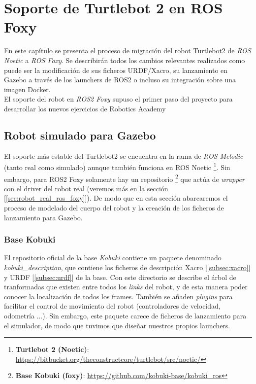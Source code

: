 \chapter{Soporte de Turtlebot 2 en ROS Foxy}
\label{cap:capitulo4}

En este capítulo se presenta el proceso de migración del robot Turtlebot2 de \textit{ROS Noetic} a \textit{ROS Foxy}. Se describirán todos los cambios relevantes realizados como puede ser la modificación de sus ficheros URDF/Xacro, su lanzamiento en Gazebo a través de los launchers de ROS2 o incluso su integración sobre una imagen Docker.\\

El soporte del robot en \textit{ROS2 Foxy} supuso el primer paso del proyecto para desarrollar los nuevos ejercicios de Robotics Academy\\




\section{Robot simulado para Gazebo}
\label{sec:robot_simulado_gazebo}
El soporte más estable del Turtlebot2 se encuentra en la rama de \textit{ROS Melodic} (tanto real como simulado) aunque también funciona en ROS Noetic \footnote{\textbf{Turtlebot 2 (Noetic)}: \url{https://bitbucket.org/theconstructcore/turtlebot/src/noetic/}}. Sin embargo, para ROS2 Foxy solamente hay un repositorio \footnote{\textbf{Base Kobuki (foxy)}: \url{https://github.com/kobuki-base/kobuki_ros}} que actúa de \textit{wrapper} con el driver del robot real (veremos más en la sección [\ref{sec:robot_real_ros_foxy}]). De modo que en esta sección abarcaremos el proceso de modelado del cuerpo del robot y la creación de los ficheros de lanzamiento para Gazebo.\\


\subsection{Base Kobuki}
\label{subsec:kobuki_base_simulado}

El repositorio oficial de la base \textit{Kobuki} contiene un paquete denominado \textit{kobuki\_description}, que contiene los ficheros de descripción Xacro [\ref{subsec:xacro}] y URDF [\ref{subsec:urdf}] de la base. Con este directorio se describe el árbol de tranformadas que existen entre todos los \textit{links} del robot, y de esta manera poder conocer la localización de todos los frames. También se añaden \textit{plugins} para facilitar el control de movimiento del robot (controladores de velocidad, odometría ...). Sin embargo, este paquete carece de ficheros de lanzamiento para el simulador, de modo que tuvimos que diseñar nuestros propios launchers.\\

